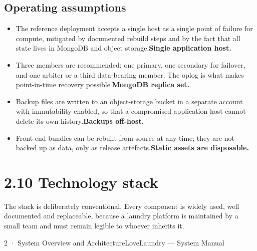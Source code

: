 \documentclass[11pt,a4paper,oneside]{book}
\begin{document}
\subsection*{Operating assumptions}
\begin{itemize}
\item The reference deployment accepts a single host as a single point of failure for compute, mitigated by documented rebuild steps and by the fact that all state lives in MongoDB and object storage.\textbf{Single application host.}
\item Three members are recommended: one primary, one secondary for failover, and one arbiter or a third data-bearing member. The oplog is what makes point-in-time recovery possible.\textbf{MongoDB replica set.}
\item Backup files are written to an object-storage bucket in a separate account with immutability enabled, so that a compromised application host cannot delete its own history.\textbf{Backups off-host.}
\item Front-end bundles can be rebuilt from source at any time; they are not backed up as data, only as release artefacts.\textbf{Static assets are disposable.}
\end{itemize}
\section{2.10 Technology stack}
The stack is deliberately conventional. Every component is widely used, well documented and replaceable, because a laundry platform is maintained by a small team and must remain legible to whoever inherits it.

2 · System Overview and ArchitectureLoveLaundry — System Manual
\end{document}
